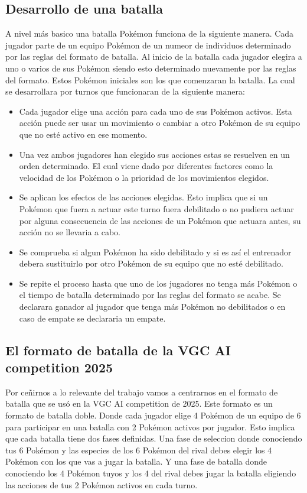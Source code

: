 \subsection{Desarrollo de una batalla}
A nivel más basico una batalla Pokémon funciona de la siguiente manera. Cada jugador parte de un equipo Pokémon de un numeor de individuos determinado por las reglas del formato de batalla. Al inicio de la batalla cada jugador elegira a uno o varios de sus Pokémon siendo esto determinado nuevamente por las reglas del formato. Estos Pokémon iniciales son los que comenzaran la batalla. La cual se desarrollara por turnos que funcionaran de la siguiente manera: 

\begin{itemize}
    \item Cada jugador elige una acción para cada uno de sus Pokémon activos. Esta acción puede ser usar un movimiento o cambiar a otro Pokémon de su equipo que no esté activo en ese momento.
    \item Una vez ambos jugadores han elegido sus acciones estas se resuelven en un orden determinado. El cual viene dado por diferentes factores como la velocidad de los Pokémon o la prioridad de los movimientos elegidos.
    \item Se aplican los efectos de las acciones elegidas. Esto implica que si un Pokémon que fuera a actuar este turno fuera debilitado o no pudiera actuar por alguna consecuencia de las acciones de un Pokémon que actuara antes, su acción no se llevaria a cabo.
    \item Se comprueba si algun Pokémon ha sido debilitado y si es así el entrenador debera sustituirlo por otro Pokémon de su equipo que no esté debilitado.
    \item Se repite el proceso hasta que uno de los jugadores no tenga más Pokémon o el tiempo de batalla determinado por las reglas del formato se acabe. Se declarara ganador al jugador que tenga más Pokémon no debilitados o en caso de empate se declararia un empate.
\end{itemize}

\subsection{El formato de batalla de la VGC AI competition 2025}

Por ceñirnos a lo relevante del trabajo vamos a centrarnos en el formato de batalla que se usó en la VGC AI competition de 2025. Este formato es un formato de batalla doble. Donde cada jugador elige 4 Pokémon de un equipo de 6 para participar en una batalla con 2 Pokémon activos por jugador. Esto implica que cada batalla tiene dos fases definidas. Una fase de seleccion donde conociendo tus 6 Pokémon y las especies de los 6 Pokémon del rival debes elegir los 4 Pokémon con los que vas a jugar la batalla. Y una fase de batalla donde conociendo los 4 Pokémon tuyos y los 4 del rival debes jugar la batalla eligiendo las acciones de tus 2 Pokémon activos en cada turno.


